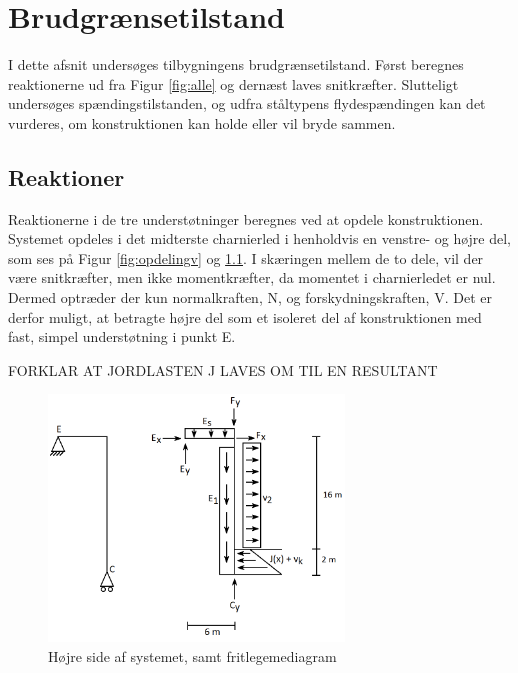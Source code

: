 \chapter{Brudgrænsetilstand}

I dette afsnit undersøges tilbygningens brudgrænsetilstand. Først beregnes reaktionerne ud fra Figur \ref{fig:alle} og dernæst laves snitkræfter. Slutteligt undersøges spændingstilstanden, og udfra ståltypens flydespændingen kan det vurderes, om konstruktionen kan holde eller vil bryde sammen.   

\section{Reaktioner}
Reaktionerne i de tre understøtninger beregnes ved at opdele konstruktionen. Systemet opdeles i det midterste charnierled i henholdvis en venstre- og højre del, som ses på Figur \ref{fig:opdelingv} og \ref{fig:opdelingh}. I skæringen mellem de to dele, vil der være snitkræfter, men ikke momentkræfter, da momentet i charnierledet er nul. Dermed optræder der kun normalkraften, N, og forskydningskraften, V. Det er derfor muligt, at betragte højre del som et isoleret del af konstruktionen med fast, simpel understøtning i punkt E.

FORKLAR AT JORDLASTEN J LAVES OM TIL EN RESULTANT

\begin{figure}[H]
	\centering
	\includegraphics[width=0.7\textwidth]{billeder/hojre.png}
	\caption{Højre side af systemet, samt fritlegemediagram}
	\label{fig:opdelingh}
\end{figure}

